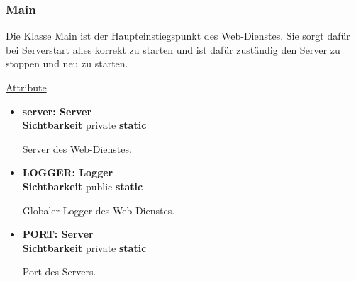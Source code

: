 \subsubsection{Main} \label{service:klasse:Main}
Die Klasse Main ist der Haupteinstiegspunkt des Web-Dienstes. Sie sorgt dafür bei Serverstart alles korrekt zu starten und ist dafür zuständig den Server zu stoppen und neu zu starten.\newline

\underline{Attribute}
\begin{itemize}
\itemsep0pt
\item \textbf{server: Server} \hfill\\ 
\textbf{Sichtbarkeit} private \newline
\textbf{static}

Server des Web-Dienstes.

\item \textbf{LOGGER: Logger} \hfill\\ 
\textbf{Sichtbarkeit} public \newline
\textbf{static}

Globaler Logger des Web-Dienstes.

\item \textbf{PORT: Server} \hfill\\ 
\textbf{Sichtbarkeit} private \newline
\textbf{static}

Port des Servers.
\end{itemize}

